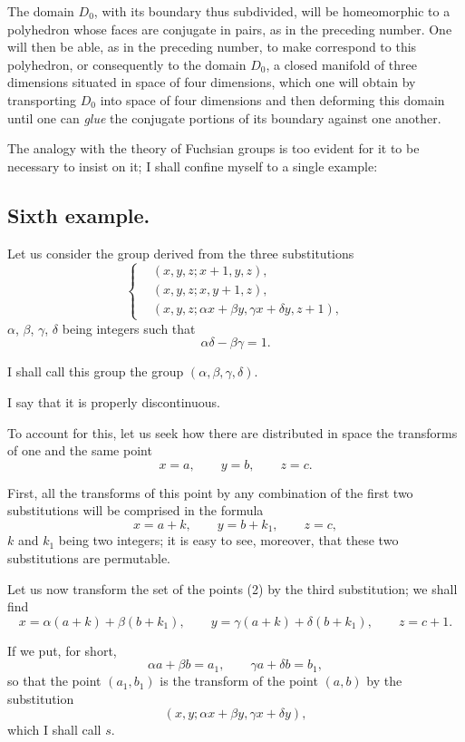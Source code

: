 \documentclass{article}
\begin{document}
The domain $D_{0}$, with its boundary thus subdivided, will be homeomorphic to a polyhedron whose faces are conjugate in pairs, as in the preceding number. One will then be able, as in the preceding number, to make correspond to this polyhedron, or consequently to the domain $D_{0}$, a closed manifold of three dimensions situated in space of four dimensions, which one will obtain by transporting $D_{0}$ into space of four dimensions and then deforming this domain until one can \emph{glue} the conjugate portions of its boundary against one another.

The analogy with the theory of Fuchsian groups is too evident for it to be necessary to insist on it; I shall confine myself to a single example:
\subsection*{Sixth example.}

Let us consider the group derived from the three substitutions
\[ \left\{ \begin{aligned} &(x, y, z; x + 1, y, z),\\ &(x, y, z; x, y + 1, z),\\ &(x, y, z; \alpha x + \beta y, \gamma x + \delta y, z + 1), \end{aligned} \right. \tag{1} \]
$\alpha$, $\beta$, $\gamma$, $\delta$ being integers such that
\[ \alpha\delta - \beta\gamma = 1. \]

I shall call this group the group $(\alpha, \beta, \gamma, \delta)$.

I say that it is properly discontinuous.

To account for this, let us seek how there are distributed in space the transforms of one and the same point
\[ x = a, \qquad y = b, \qquad z = c. \]

First, all the transforms of this point by any combination of the first two substitutions will be comprised in the formula
\[ x = a + k, \qquad y = b + k_{1}, \qquad z = c, \tag{2} \]
$k$ and $k_{1}$ being two integers; it is easy to see, moreover, that these two substitutions are permutable.

Let us now transform the set of the points (2) by the third substitution; we shall find
\[ x = \alpha(a + k) + \beta(b + k_{1}), \qquad y = \gamma(a + k) + \delta(b + k_{1}), \qquad z = c + 1. \tag{3} \]

If we put, for short,
\[ \alpha a + \beta b = a_{1}, \qquad \gamma a + \delta b = b_{1}, \]
so that the point $(a_{1}, b_{1})$ is the transform of the point $(a, b)$ by the substitution
\[ (x, y; \alpha x + \beta y, \gamma x + \delta y), \]
which I shall call $s$.
\end{document}
